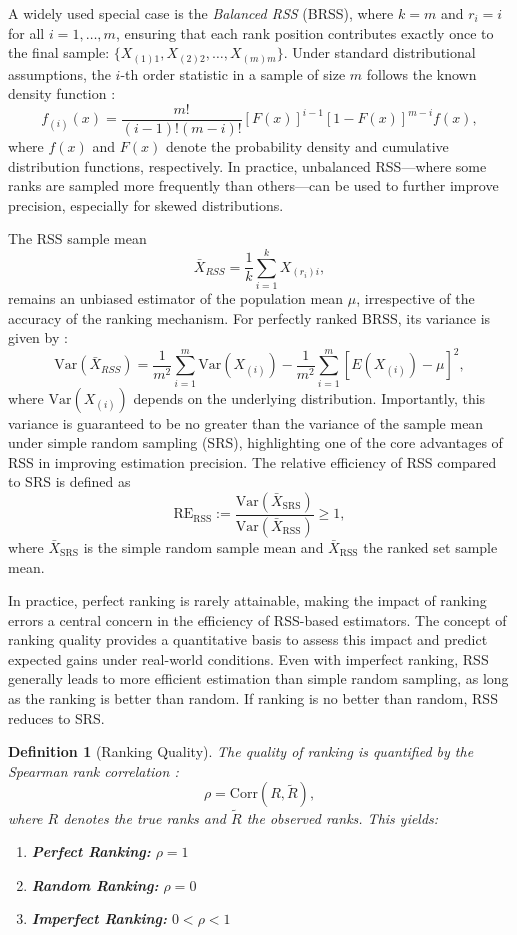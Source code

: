 \documentclass[12pt]{article}
\newtheorem{definition}{Definition}[section] %
\begin{document}
A widely used special case is the \textit{Balanced RSS} (BRSS), where $k = m$ and $r_i = i$ for all $i = 1, \ldots, m$, ensuring that each rank position contributes exactly once to the final sample: $\{X_{(1)1}, X_{(2)2}, \ldots, X_{(m)m}\}$. Under standard distributional assumptions, the $i$-th order statistic in a sample of size $m$ follows the known density function \cite{ChenStasnyWolfe2006}:
\[
f_{(i)}(x) = \frac{m!}{(i-1)!(m-i)!} [F(x)]^{i-1} [1-F(x)]^{m-i} f(x),
\]
where $f(x)$ and $F(x)$ denote the probability density and cumulative distribution functions, respectively.
In practice, unbalanced RSS—where some ranks are sampled more frequently than others—can be used to further improve precision, especially for skewed distributions.

The RSS sample mean
\[
\bar{X}_{RSS} = \frac{1}{k} \sum_{i=1}^{k} X_{(r_i)i},
\]
remains an unbiased estimator of the population mean $\mu$, irrespective of the accuracy of the ranking mechanism. For perfectly ranked BRSS, its variance is given by \cite{ChenStasnyWolfe2006}:
\[
\text{Var}(\bar{X}_{RSS}) = \frac{1}{m^2} \sum_{i=1}^{m} \text{Var}(X_{(i)}) - \frac{1}{m^2} \sum_{i=1}^{m} \left[ E(X_{(i)}) - \mu \right]^2,
\]
where $\text{Var}(X_{(i)})$ depends on the underlying distribution. Importantly, this variance is guaranteed to be no greater than the variance of the sample mean under simple random sampling (SRS), highlighting one of the core advantages of RSS in improving estimation precision. The relative efficiency of RSS compared to SRS is defined as
\begin{equation}
\label{eq:re_general}
\text{RE}_{\text{RSS}} := \frac{\text{Var}(\bar{X}_{\text{SRS}})}{\text{Var}(\bar{X}_{\text{RSS}})} \geq 1,
\end{equation}
where $\bar{X}_{\text{SRS}}$ is the simple random sample mean and $\bar{X}_{\text{RSS}}$ the ranked set sample mean.

In practice, perfect ranking is rarely attainable, making the impact of ranking errors a central concern in the efficiency of RSS-based estimators. The concept of ranking quality provides a quantitative basis to assess this impact and predict expected gains under real-world conditions.
Even with imperfect ranking, RSS generally leads to more efficient estimation than simple random sampling, as long as the ranking is better than random. If ranking is no better than random, RSS reduces to SRS.
\begin{definition}[Ranking Quality]
\label{def:ranking_quality}
The quality of ranking is quantified by the Spearman rank correlation \cite{taconeli2023,taconeli2023dual}:
\begin{equation}
\rho = \text{Corr}(R, \tilde{R}),
\end{equation}
where $R$ denotes the true ranks and $\tilde{R}$ the observed ranks. This yields:
\begin{enumerate}
    \item \textbf{Perfect Ranking:} $\rho = 1$
    \item \textbf{Random Ranking:} $\rho = 0$
    \item \textbf{Imperfect Ranking:} $0 < \rho < 1$
\end{enumerate}
\end{definition}
\end{document}
